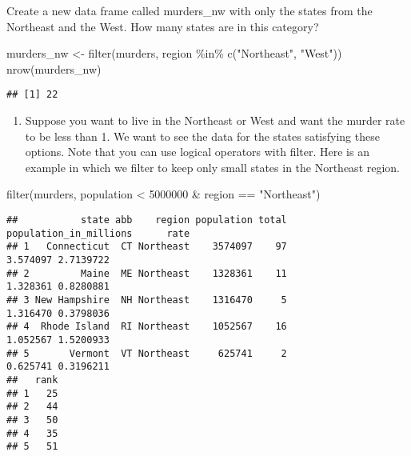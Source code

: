 \documentclass[
]{article}
\newenvironment{Shaded}{\begin{snugshade}}{\end{snugshade}}
\newcommand{\DecValTok}[1]{\textcolor[rgb]{0.00,0.00,0.81}{#1}}
\newcommand{\FunctionTok}[1]{\textcolor[rgb]{0.00,0.00,0.00}{#1}}
\newcommand{\NormalTok}[1]{#1}
\newcommand{\OtherTok}[1]{\textcolor[rgb]{0.56,0.35,0.01}{#1}}
\newcommand{\SpecialCharTok}[1]{\textcolor[rgb]{0.00,0.00,0.00}{#1}}
\newcommand{\StringTok}[1]{\textcolor[rgb]{0.31,0.60,0.02}{#1}}
\providecommand{\tightlist}{%
  \setlength{\itemsep}{0pt}\setlength{\parskip}{0pt}}
\begin{document}
Create a new data frame called murders\_nw with only the states from the
Northeast and the West. How many states are in this category?

\begin{Shaded}
\begin{Highlighting}[]
\NormalTok{murders\_nw }\OtherTok{\textless{}{-}} \FunctionTok{filter}\NormalTok{(murders, region }\SpecialCharTok{\%in\%} \FunctionTok{c}\NormalTok{(}\StringTok{"Northeast"}\NormalTok{, }\StringTok{"West"}\NormalTok{))}
\FunctionTok{nrow}\NormalTok{(murders\_nw)}
\end{Highlighting}
\end{Shaded}

\begin{verbatim}
## [1] 22
\end{verbatim}

\begin{enumerate}
\def\labelenumi{\arabic{enumi}.}
\setcounter{enumi}{6}
\tightlist
\item
  Suppose you want to live in the Northeast or West and want the murder
  rate to be less than 1. We want to see the data for the states
  satisfying these options. Note that you can use logical operators with
  filter. Here is an example in which we filter to keep only small
  states in the Northeast region.
\end{enumerate}

\begin{Shaded}
\begin{Highlighting}[]
\FunctionTok{filter}\NormalTok{(murders, population }\SpecialCharTok{\textless{}} \DecValTok{5000000} \SpecialCharTok{\&}\NormalTok{ region }\SpecialCharTok{==} \StringTok{"Northeast"}\NormalTok{)}
\end{Highlighting}
\end{Shaded}

\begin{verbatim}
##           state abb    region population total population_in_millions      rate
## 1   Connecticut  CT Northeast    3574097    97               3.574097 2.7139722
## 2         Maine  ME Northeast    1328361    11               1.328361 0.8280881
## 3 New Hampshire  NH Northeast    1316470     5               1.316470 0.3798036
## 4  Rhode Island  RI Northeast    1052567    16               1.052567 1.5200933
## 5       Vermont  VT Northeast     625741     2               0.625741 0.3196211
##   rank
## 1   25
## 2   44
## 3   50
## 4   35
## 5   51
\end{verbatim}
\end{document}
